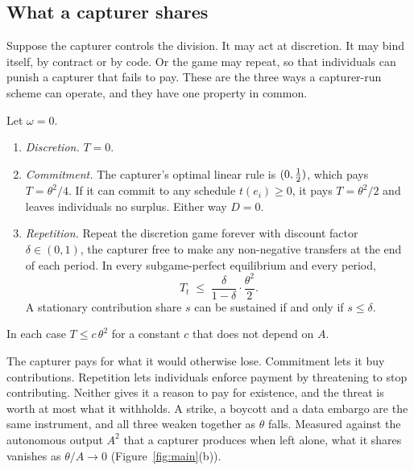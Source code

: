 \subsection{What a capturer shares}

Suppose the capturer controls the division. It may act at discretion. It may bind itself,
by contract or by code. Or the game may repeat, so that individuals can punish a capturer
that fails to pay. These are the three ways a capturer-run scheme can operate, and they
have one property in common.

\begin{proposition}\label{prop:capt}
Let $\omega=0$.
\begin{enumerate}[label=(\alph*)]
\item \emph{Discretion.} $T=0$.
\item \emph{Commitment.} The capturer's optimal linear rule is $(0,\tfrac{1}{2})$, which pays
      $T=\theta^2/4$. If it can commit to any schedule $t(e_i)\ge 0$, it pays
      $T=\theta^2/2$ and leaves individuals no surplus. Either way $D=0$.
\item \emph{Repetition.} Repeat the discretion game forever with discount factor
      $\delta\in(0,1)$, the capturer free to make any non-negative transfers at the end of
      each period. In every subgame-perfect equilibrium and every period,
      \begin{equation}\label{eq:bound}
        T_t\;\le\;\frac{\delta}{1-\delta}\cdot\frac{\theta^2}{2}.
      \end{equation}
      A stationary contribution share $s$ can be sustained if and only if $s\le\delta$.
\end{enumerate}
In each case $T\le c\,\theta^2$ for a constant $c$ that does not depend on $A$.
\end{proposition}

The capturer pays for what it would otherwise lose. Commitment lets it buy contributions.
Repetition lets individuals enforce payment by threatening to stop contributing. Neither
gives it a reason to pay for existence, and the threat is worth at most what it withholds.
A strike, a boycott and a data embargo are the same instrument, and all three weaken
together as $\theta$ falls. Measured against the autonomous output $A^2$ that a capturer
produces when left alone, what it shares vanishes as $\theta/A\to 0$
(Figure~\ref{fig:main}(b)).

